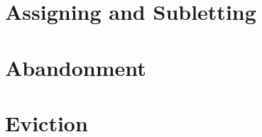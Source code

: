 \section{Assigning and Subletting}







\begin{questions}[Problems]

\end{questions}


\section{Abandonment}





\begin{questions}

\end{questions}



\section{Eviction}





\begin{questions}

\end{questions}


